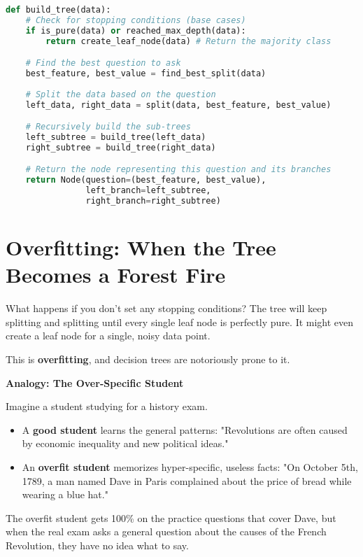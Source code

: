 \documentclass[11pt, letterpaper, openany]{book}
\begin{document}
\begin{lstlisting}[language=Python, caption={Super simplified pseudo-code}]
def build_tree(data):
    # Check for stopping conditions (base cases)
    if is_pure(data) or reached_max_depth(data):
        return create_leaf_node(data) # Return the majority class

    # Find the best question to ask
    best_feature, best_value = find_best_split(data)
    
    # Split the data based on the question
    left_data, right_data = split(data, best_feature, best_value)

    # Recursively build the sub-trees
    left_subtree = build_tree(left_data)
    right_subtree = build_tree(right_data)

    # Return the node representing this question and its branches
    return Node(question=(best_feature, best_value), 
                left_branch=left_subtree, 
                right_branch=right_subtree)
\end{lstlisting}

\section{Overfitting: When the Tree Becomes a Forest Fire}

What happens if you don't set any stopping conditions? The tree will keep splitting and splitting until every single leaf node is perfectly pure. It might even create a leaf node for a single, noisy data point.

This is \textbf{overfitting}, and decision trees are notoriously prone to it.

\textbf{Analogy: The Over-Specific Student}

Imagine a student studying for a history exam.
\begin{itemize}
    \item A \textbf{good student} learns the general patterns: "Revolutions are often caused by economic inequality and new political ideas."
    \item An \textbf{overfit student} memorizes hyper-specific, useless facts: "On October 5th, 1789, a man named Dave in Paris complained about the price of bread while wearing a blue hat."
\end{itemize}
The overfit student gets 100\% on the practice questions that cover Dave, but when the real exam asks a general question about the causes of the French Revolution, they have no idea what to say.
\end{document}
